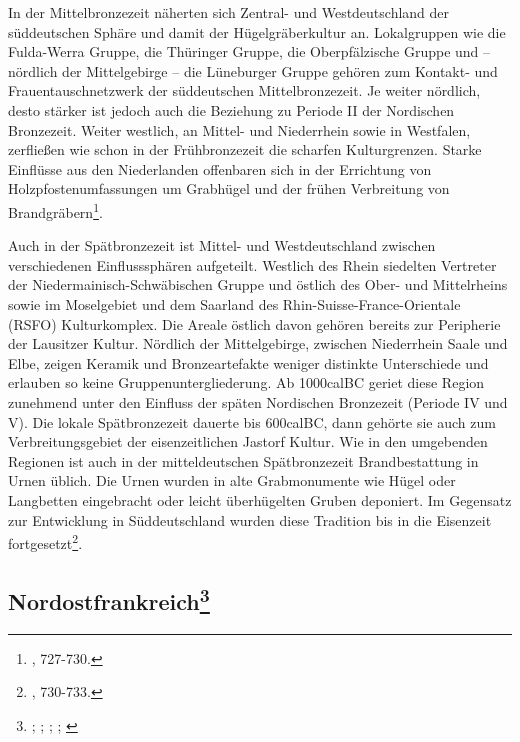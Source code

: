 \documentclass[openany,twoside,twocolumn]{book}
\let\rmarkdownfootnote\footnote%
\def\footnote{\protect\rmarkdownfootnote}
\begin{document}
In der Mittelbronzezeit näherten sich Zentral- und Westdeutschland der
süddeutschen Sphäre und damit der Hügelgräberkultur an. Lokalgruppen wie
die Fulda-Werra Gruppe, die Thüringer Gruppe, die Oberpfälzische Gruppe
und -- nördlich der Mittelgebirge -- die Lüneburger Gruppe gehören zum
Kontakt- und Frauentauschnetzwerk der süddeutschen Mittelbronzezeit. Je
weiter nördlich, desto stärker ist jedoch auch die Beziehung zu Periode
II der Nordischen Bronzezeit. Weiter westlich, an Mittel- und
Niederrhein sowie in Westfalen, zerfließen wie schon in der
Frühbronzezeit die scharfen Kulturgrenzen. Starke Einflüsse aus den
Niederlanden offenbaren sich in der Errichtung von
Holzpfostenumfassungen um Grabhügel und der frühen Verbreitung von
Brandgräbern\footnote{\textcite{jockenhovel_germany_2013}, 727-730.}.

Auch in der Spätbronzezeit ist Mittel- und Westdeutschland zwischen
verschiedenen Einflusssphären aufgeteilt. Westlich des Rhein siedelten
Vertreter der Niedermainisch-Schwäbischen Gruppe und östlich des Ober-
und Mittelrheins sowie im Moselgebiet und dem Saarland des
Rhin-Suisse-France-Orientale (RSFO) Kulturkomplex. Die Areale östlich
davon gehören bereits zur Peripherie der Lausitzer Kultur. Nördlich der
Mittelgebirge, zwischen Niederrhein Saale und Elbe, zeigen Keramik und
Bronzeartefakte weniger distinkte Unterschiede und erlauben so keine
Gruppenuntergliederung. Ab 1000calBC geriet diese Region zunehmend unter
den Einfluss der späten Nordischen Bronzezeit (Periode IV und V). Die
lokale Spätbronzezeit dauerte bis 600calBC, dann gehörte sie auch zum
Verbreitungsgebiet der eisenzeitlichen Jastorf Kultur. Wie in den
umgebenden Regionen ist auch in der mitteldeutschen Spätbronzezeit
Brandbestattung in Urnen üblich. Die Urnen wurden in alte Grabmonumente
wie Hügel oder Langbetten eingebracht oder leicht überhügelten Gruben
deponiert. Im Gegensatz zur Entwicklung in Süddeutschland wurden diese
Tradition bis in die Eisenzeit fortgesetzt\footnote{\textcite{jockenhovel_germany_2013},
  730-733.}.

\hypertarget{nordostfrankreich}{%
\subsection[Nordostfrankreich]{\texorpdfstring{Nordostfrankreich\footnote{\textcite{bourgeois_lage_2005-1};
  \textcite{briard_groupe_1988}; \textcite{gomez_bronze_1995};
  \textcite{mordant_bronze_2013}; \textcite{mordant_les_2005}}}{Nordostfrankreich}}\label{nordostfrankreich}}
\end{document}
